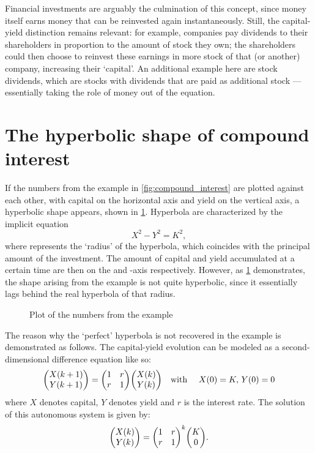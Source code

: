Financial investments are arguably the culmination of this concept, since money itself earns money that can be reinvested again instantaneously. Still, the capital-yield distinction remains relevant: for example, companies pay dividends to their shareholders in proportion to the amount of stock they own; the shareholders could then choose to reinvest these earnings in more stock of that (or another) company, increasing their `capital'. An additional example here are stock dividends, which are stocks with dividends that are paid as additional stock --- essentially taking the role of money out of the equation.

\section{The hyperbolic shape of compound interest}
If the numbers from the example in \cref{fig:compound_interest} are plotted against each other, with capital on the horizontal axis and yield on the vertical axis, a hyperbolic shape appears, shown in \cref{fig:hyperbolic_compounding}. Hyperbola are characterized by the implicit equation 
$$ X^2 - Y^2 = K^2, $$
where  represents the `radius' of the hyperbola, which coincides with the principal amount of the investment. The amount of capital and yield accumulated at a certain time are then on the  and -axis respectively. However, as \cref{fig:hyperbolic_compounding} demonstrates, the shape arising from the example is not quite hyperbolic, since it essentially lags behind the real hyperbola of that radius.
\begin{figure}[h!]
    \centering
    
    \caption{Plot of the numbers from the example }
    \label{fig:hyperbolic_compounding}
\end{figure}
The reason why the `perfect' hyperbola is not recovered in the example is demonstrated as follows. The capital-yield evolution can be modeled as a second-dimensional difference equation like so:
$$ \mqty(X(k+1)\\Y(k+1)) = \mqty(1& r \\ r & 1)\mqty(X(k)\\Y(k))\qq{with }X(0) = K,\, Y(0) = 0 $$
where $X$ denotes capital, $Y$ denotes yield and $r$ is the interest rate. The solution of this autonomous system is given by:
$$ \mqty(X(k)\\Y(k)) = \mqty(1& r \\ r & 1)^k\mqty(\ininv\\0). $$
